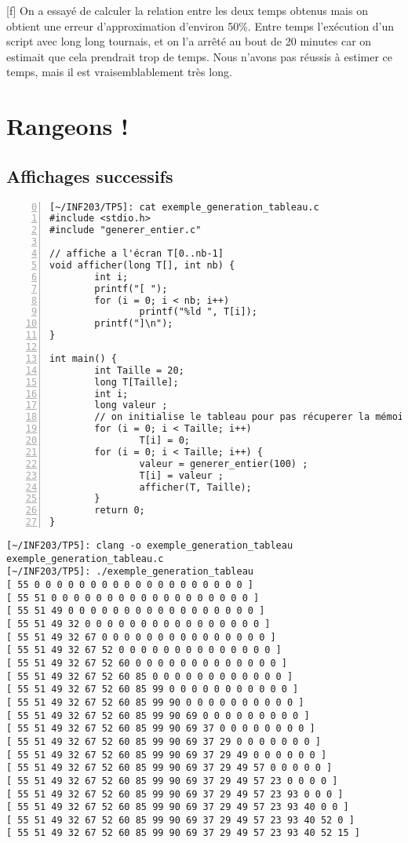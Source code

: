 \documentclass[12pt,a4paper,notitlepage,colorinlistoftodos]{article}
\begin{document}
[f]
On a essayé de calculer la relation entre les deux temps obtenus mais on obtient une erreur d'approximation d'environ 50\%. 
Entre temps l'exécution d'un script avec long long tournais, et on l'a arrêté au bout de 20 minutes car on estimait que cela prendrait trop de temps.
Nous n'avons pas réussis à estimer ce temps, mais il est vraisemblablement très long.

\newpage
\section{Rangeons !}

\subsection{Affichages successifs}

\begin{lstlisting}[numbers=left, firstnumber = 0 ]
[~/INF203/TP5]: cat exemple_generation_tableau.c
#include <stdio.h>
#include "generer_entier.c"

// affiche a l'écran T[0..nb-1]
void afficher(long T[], int nb) {
        int i;
        printf("[ ");
        for (i = 0; i < nb; i++) 
                printf("%ld ", T[i]);
        printf("]\n");
}

int main() {
        int Taille = 20;
        long T[Taille];
        int i;
        long valeur ;
        // on initialise le tableau pour pas récuperer la mémoire précédente
        for (i = 0; i < Taille; i++) 
                T[i] = 0;
        for (i = 0; i < Taille; i++) {
                valeur = generer_entier(100) ;
                T[i] = valeur ;
                afficher(T, Taille);
        }
        return 0;
}
\end{lstlisting}


\begin{lstlisting}
[~/INF203/TP5]: clang -o exemple_generation_tableau exemple_generation_tableau.c
[~/INF203/TP5]: ./exemple_generation_tableau 
[ 55 0 0 0 0 0 0 0 0 0 0 0 0 0 0 0 0 0 0 0 ]
[ 55 51 0 0 0 0 0 0 0 0 0 0 0 0 0 0 0 0 0 0 ]
[ 55 51 49 0 0 0 0 0 0 0 0 0 0 0 0 0 0 0 0 0 ]
[ 55 51 49 32 0 0 0 0 0 0 0 0 0 0 0 0 0 0 0 0 ]
[ 55 51 49 32 67 0 0 0 0 0 0 0 0 0 0 0 0 0 0 0 ]
[ 55 51 49 32 67 52 0 0 0 0 0 0 0 0 0 0 0 0 0 0 ]
[ 55 51 49 32 67 52 60 0 0 0 0 0 0 0 0 0 0 0 0 0 ]
[ 55 51 49 32 67 52 60 85 0 0 0 0 0 0 0 0 0 0 0 0 ]
[ 55 51 49 32 67 52 60 85 99 0 0 0 0 0 0 0 0 0 0 0 ]
[ 55 51 49 32 67 52 60 85 99 90 0 0 0 0 0 0 0 0 0 0 ]
[ 55 51 49 32 67 52 60 85 99 90 69 0 0 0 0 0 0 0 0 0 ]
[ 55 51 49 32 67 52 60 85 99 90 69 37 0 0 0 0 0 0 0 0 ]
[ 55 51 49 32 67 52 60 85 99 90 69 37 29 0 0 0 0 0 0 0 ]
[ 55 51 49 32 67 52 60 85 99 90 69 37 29 49 0 0 0 0 0 0 ]
[ 55 51 49 32 67 52 60 85 99 90 69 37 29 49 57 0 0 0 0 0 ]
[ 55 51 49 32 67 52 60 85 99 90 69 37 29 49 57 23 0 0 0 0 ]
[ 55 51 49 32 67 52 60 85 99 90 69 37 29 49 57 23 93 0 0 0 ]
[ 55 51 49 32 67 52 60 85 99 90 69 37 29 49 57 23 93 40 0 0 ]
[ 55 51 49 32 67 52 60 85 99 90 69 37 29 49 57 23 93 40 52 0 ]
[ 55 51 49 32 67 52 60 85 99 90 69 37 29 49 57 23 93 40 52 15 ]  
\end{lstlisting}
\end{document}
